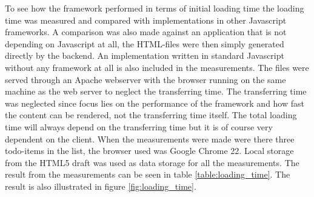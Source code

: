To see how the framework performed in terms of initial loading time the loading time was measured and compared with implementations in other Javascript frameworks. A comparison was also made against an application that is not depending on Javascript at all, the HTML-files were then simply generated directly by the backend. An implementation written in standard Javascript without any framework at all is also included in the measurements. The files were served through an Apache webserver with the browser running on the same machine as the web server to neglect the transferring time. The transferring time was neglected since focus lies on the performance of the framework and how fast the content can be rendered, not the transferring time itself. The total loading time will always depend on the transferring time but it is of course very dependent on the client. When the measurements were made were there three todo-items in the list, the browser used was Google Chrome 22. Local storage from the HTML5 draft was used as data storage for all the measurements. The result from the measurements can be seen in table \ref{table:loading_time}. The result is also illustrated in figure \ref{fig:loading_time}.

\begin{table}[H]
	\begin{center}
		\noindent{}
		\caption{The loading time of the test application in different implementations.}
		\label{table:loading_time}
	\end{center}
\end{table}

